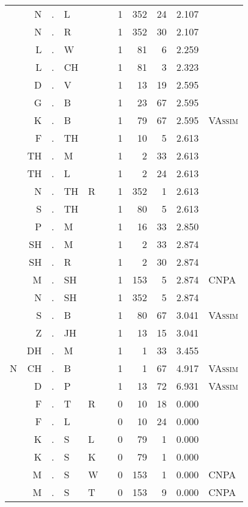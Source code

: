 \begin{longtable}{r@{ } r@{ } c@{ } l@{ } l@{ } l@{ } r r r r l }
  & N & . & L &   &   & 1 & 352 & 24 & 2.107 &  \\
  & N & . & R &   &   & 1 & 352 & 30 & 2.107 &  \\
  & L & . & W &   &   & 1 & 81 & 6 & 2.259 &  \\
  & L & . & CH &   &   & 1 & 81 & 3 & 2.323 &  \\
  & D & . & V &   &   & 1 & 13 & 19 & 2.595 &  \\
  & G & . & B &   &   & 1 & 23 & 67 & 2.595 &  \\
  & K & . & B &   &   & 1 & 79 & 67 & 2.595 & \textsc{VAssim} \\
  & F & . & TH &   &   & 1 & 10 & 5 & 2.613 &  \\
  & TH & . & M &   &   & 1 & 2 & 33 & 2.613 &  \\
  & TH & . & L &   &   & 1 & 2 & 24 & 2.613 &  \\
  & N & . & TH & R &   & 1 & 352 & 1 & 2.613 &  \\
  & S & . & TH &   &   & 1 & 80 & 5 & 2.613 &  \\
  & P & . & M &   &   & 1 & 16 & 33 & 2.850 &  \\
  & SH & . & M &   &   & 1 & 2 & 33 & 2.874 &  \\
  & SH & . & R &   &   & 1 & 2 & 30 & 2.874 &  \\
  & M & . & SH &   &   & 1 & 153 & 5 & 2.874 & \textsc{CNPA} \\
  & N & . & SH &   &   & 1 & 352 & 5 & 2.874 &  \\
  & S & . & B &   &   & 1 & 80 & 67 & 3.041 & \textsc{VAssim} \\
  & Z & . & JH &   &   & 1 & 13 & 15 & 3.041 &  \\
  & DH & . & M &   &   & 1 & 1 & 33 & 3.455 &  \\
N & CH & . & B &   &   & 1 & 1 & 67 & 4.917 & \textsc{VAssim} \\
  & D & . & P &   &   & 1 & 13 & 72 & 6.931 & \textsc{VAssim} \\
  & F & . & T & R &   & 0 & 10 & 18 & 0.000 &  \\
  & F & . & L &   &   & 0 & 10 & 24 & 0.000 &  \\
  & K & . & S & L &   & 0 & 79 & 1 & 0.000 &  \\
  & K & . & S & K &   & 0 & 79 & 1 & 0.000 &  \\
  & M & . & S & W &   & 0 & 153 & 1 & 0.000 & \textsc{CNPA} \\
  & M & . & S & T &   & 0 & 153 & 9 & 0.000 & \textsc{CNPA} \\

\end{longtable}
